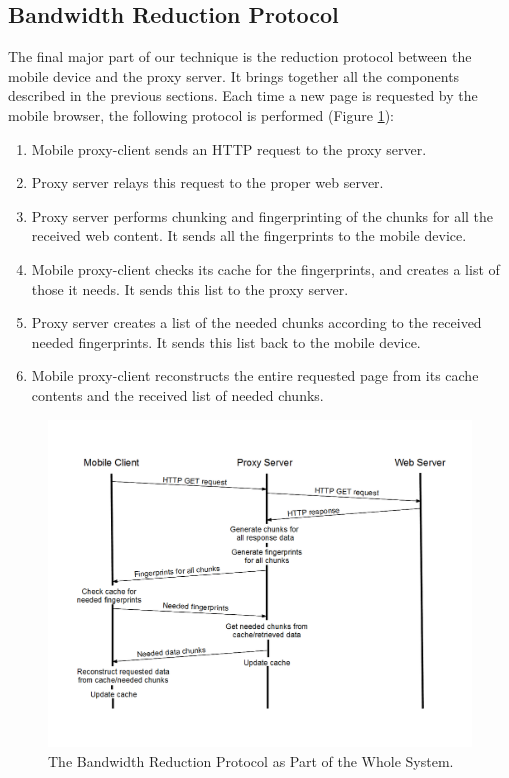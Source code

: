 \subsection{Bandwidth Reduction Protocol}
\label{sec:protocol}
The final major part of our technique is the reduction protocol between the mobile device and the proxy server. It brings together all the components described in the previous sections. Each time a new page is requested by the mobile browser, the following protocol is performed (Figure \ref{fig:protocol}):

\begin{enumerate}
\item Mobile proxy-client sends an HTTP request to the proxy server.
\item Proxy server relays this request to the proper web server.
\item Proxy server performs chunking and fingerprinting of the chunks for all the received web content. It sends all the fingerprints to the mobile device.
\item Mobile proxy-client checks its cache for the fingerprints, and creates a list of those it needs. It sends this list to the proxy server.
\item Proxy server creates a list of the needed chunks according to the received needed fingerprints. It sends this list back to the mobile device.
\item Mobile proxy-client reconstructs the entire requested page from its cache contents and the received list of needed chunks.
\end{enumerate}

\begin{figure}[h] 
\centering \includegraphics[width=\columnwidth]{images/protocol_diagram.png}
\caption{The Bandwidth Reduction Protocol as Part of the Whole System.}
\label{fig:protocol}
\end{figure}

